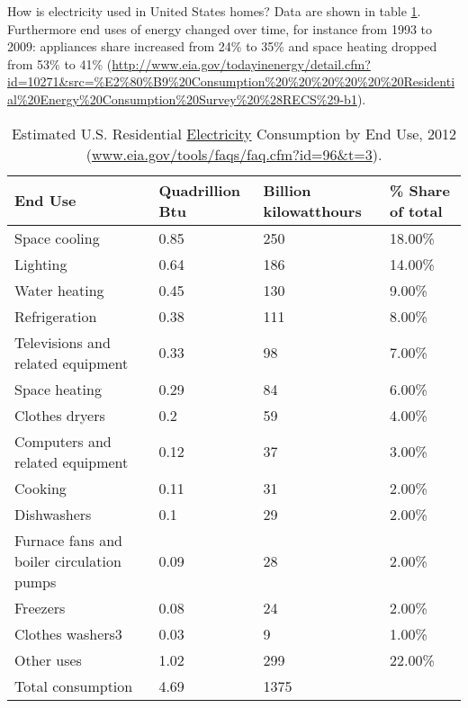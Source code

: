 \documentclass[10pt, letterpaper]{article}
\begin{document}
\begin{spacing}{1.0}
How is electricity used in United States homes? %
Data are shown in table
\ref{eleEndUse}. Furthermore end uses of energy changed over time, for instance
 from 1993 to 2009: appliances share increased from 24\% to 35\% and space
 heating dropped from 53\% to 41\%
 (\url{http://www.eia.gov/todayinenergy/detail.cfm?id=10271&src=%E2%80%B9%20Consumption%20%20%20%20%20%20Residential%20Energy%20Consumption%20Survey%20%28RECS%29-b1}). 


\begin{table}[H]\centering\footnotesize
\caption{\label{eleEndUse}  Estimated U.S. Residential \underline{Electricity} Consumption by End
  Use, 2012 (\url{www.eia.gov/tools/faqs/faq.cfm?id=96&t=3}).}
\begin{tabular} {llll}   \hline 
End Use&Quadrillion Btu &Billion kilowatthours& \% Share of total\\\hline 
Space cooling&0.85&250&18.00\%\\
Lighting&0.64&186&14.00\%\\
Water heating&0.45&130&9.00\%\\
Refrigeration&0.38&111&8.00\%\\
Televisions and related equipment&0.33&98&7.00\%\\
Space heating&0.29&84&6.00\%\\
Clothes dryers&0.2&59&4.00\%\\
Computers and related equipment&0.12&37&3.00\%\\
Cooking&0.11&31&2.00\%\\
Dishwashers &0.1&29&2.00\%\\
Furnace fans and boiler circulation pumps&0.09&28&2.00\%\\
Freezers&0.08&24&2.00\%\\
Clothes washers3&0.03&9&1.00\%\\
Other uses&1.02&299&22.00\%\\\hline
Total consumption&4.69&1375&\\\hline
\end{tabular}\end{table}


\end{spacing}
\end{document}

